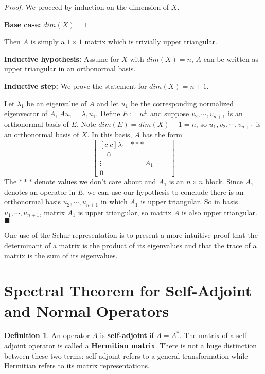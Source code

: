 \documentclass[a4paper,10pt]{book}
\theoremstyle{plain}
\renewenvironment{proof}{\textsl{Proof.}}{\hfill$\blacksquare$}
\theoremstyle{plain}
\theoremstyle{definition}
\newtheorem{definition}{Definition}[section]
\begin{document}
\begin{proof}
We proceed by induction on the dimension of $X$. 

\textbf{Base case:} $dim(X) = 1$

Then $A$ is simply a $1 \times 1$ matrix which is trivially upper triangular. 

\textbf{Inductive hypothesis:} Assume for $X$ with $dim(X) = n$, $A$ can be written as upper triangular in an orthonormal basis. 

\textbf{Inductive step:} We prove the statement for $dim(X) = n + 1$. 

Let $\lambda_{1}$ be an eigenvalue of $A$ and let $u_{1}$ be the corresponding normalized eigenvector of $A$, $Au_{1} = \lambda_{1} u_{1}$. Define $E := u_{1}^{\perp}$ and suppose $v_{2}, \cdots, v_{n + 1}$ is an orthonormal basis of $E$. Note $dim(E) = dim(X) - 1 = n$, so $u_{1}, v_{2}, \cdots, v_{n + 1}$ is an orthonormal basis of $X$. In this basis, $A$ has the form 
$$\begin{bmatrix}[c|c]
\lambda_{1} & *** \\
\hline 
\quad 0 \quad &  \\
\vdots & \qquad A_{1} \qquad \\
0 & 
\end{bmatrix}
$$
The $***$ denote values we don't care about and $A_{1}$ is an $n \times n$ block. Since $A_{1}$ denotes an operator in $E$, we can use our hypothesis to conclude there is an orthonormal basis $u_{2}, \cdots, u_{n + 1}$ in which $A_{1}$ is upper triangular. So in basis $u_{1}, \cdots, u_{n + 1}$, matrix $A_{1}$ is upper triangular, so matrix $A$ is also upper triangular.
\end{proof}

One use of the Schur representation is to present a more intuitive proof that the determinant of a matrix is the product of its eigenvalues and that the trace of a matrix is the sum of its eigenvalues. 

\section{Spectral Theorem for Self-Adjoint and Normal Operators}

\begin{definition}
An operator $A$ is \textbf{self-adjoint} if $A = A^{*}$. The matrix of a self-adjoint operator is called a \textbf{Hermitian matrix}. There is not a huge distinction between these two terms: self-adjoint refers to a general transformation while Hermitian refers to its matrix representations.
\end{definition}
\end{document}

